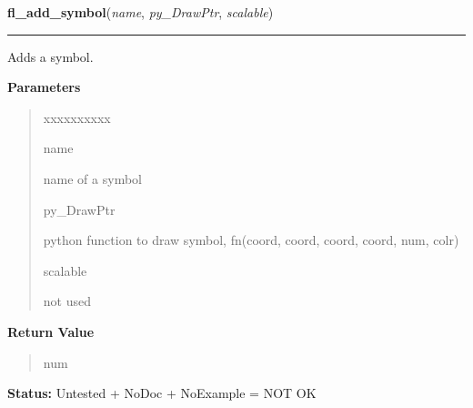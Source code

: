 \hspace{.8\funcindent}\begin{boxedminipage}{\funcwidth}

    \raggedright \textbf{fl\_add\_symbol}(\textit{name}, \textit{py\_DrawPtr}, \textit{scalable})

    \vspace{-1.5ex}

    \rule{\textwidth}{0.5\fboxrule}
\setlength{\parskip}{2ex}
    Adds a symbol.

\setlength{\parskip}{1ex}
      \textbf{Parameters}
      \vspace{-1ex}

      \begin{quote}
        \begin{Ventry}{xxxxxxxxxx}

          \item[name]

          name of a symbol

          \item[py\_DrawPtr]

          python function to draw symbol, fn(coord, coord, coord, coord, 
          num, colr)

          \item[scalable]

          not used

        \end{Ventry}

      \end{quote}

      \textbf{Return Value}
    \vspace{-1ex}

      \begin{quote}
      num

      \end{quote}

\textbf{Status:} Untested + NoDoc + NoExample = NOT OK



    \end{boxedminipage}

    \label{xformslib:library:fl_draw_symbol}

    \vspace{0.5ex}

